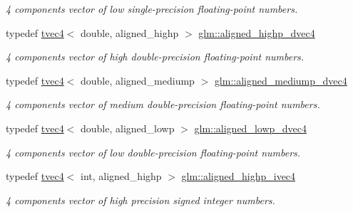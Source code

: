 \begin{DoxyCompactItemize}
\begin{DoxyCompactList}\small\item\em 4 components vector of low single-\/precision floating-\/point numbers. \end{DoxyCompactList}\item 
\mbox{\label{group__gtc__type__aligned_ga96f78b78823a228d1ca0cfa3be7e6a64}} 
typedef \hyperlink{structglm_1_1tvec4}{tvec4}$<$ double, aligned\+\_\+highp $>$ \hyperlink{group__gtc__type__aligned_ga96f78b78823a228d1ca0cfa3be7e6a64}{glm\+::aligned\+\_\+highp\+\_\+dvec4}
\begin{DoxyCompactList}\small\item\em 4 components vector of high double-\/precision floating-\/point numbers. \end{DoxyCompactList}\item 
\mbox{\label{group__gtc__type__aligned_ga8ba1fb56271d8ffeb78283f0c3426635}} 
typedef \hyperlink{structglm_1_1tvec4}{tvec4}$<$ double, aligned\+\_\+mediump $>$ \hyperlink{group__gtc__type__aligned_ga8ba1fb56271d8ffeb78283f0c3426635}{glm\+::aligned\+\_\+mediump\+\_\+dvec4}
\begin{DoxyCompactList}\small\item\em 4 components vector of medium double-\/precision floating-\/point numbers. \end{DoxyCompactList}\item 
\mbox{\label{group__gtc__type__aligned_ga9fc744c166048040931a89a30f282674}} 
typedef \hyperlink{structglm_1_1tvec4}{tvec4}$<$ double, aligned\+\_\+lowp $>$ \hyperlink{group__gtc__type__aligned_ga9fc744c166048040931a89a30f282674}{glm\+::aligned\+\_\+lowp\+\_\+dvec4}
\begin{DoxyCompactList}\small\item\em 4 components vector of low double-\/precision floating-\/point numbers. \end{DoxyCompactList}\item 
\mbox{\label{group__gtc__type__aligned_ga4dcc1c7c3d087b9f61635069fc97671b}} 
typedef \hyperlink{structglm_1_1tvec4}{tvec4}$<$ int, aligned\+\_\+highp $>$ \hyperlink{group__gtc__type__aligned_ga4dcc1c7c3d087b9f61635069fc97671b}{glm\+::aligned\+\_\+highp\+\_\+ivec4}
\begin{DoxyCompactList}\small\item\em 4 components vector of high precision signed integer numbers. \end{DoxyCompactList}\item 

\end{DoxyCompactItemize}
